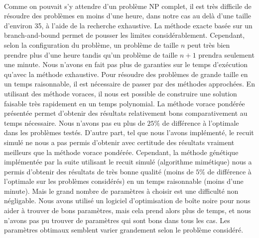 \documentclass[12pt,letterpaper,twoside]{article}
\begin{document}
		\paragraph*{}
			Comme on pouvait s'y attendre d'un problème NP complet,
			il est très difficile de résoudre des problèmes en moins d'une heure, dans notre cas au delà d'une
			taille d'environ 35, à l'aide de la recherche exhaustive.
			La méthode exacte basée sur un branch-and-bound permet de pousser les limites considérablement.
			Cependant, selon la configuration du problème, un problème de taille \(n\) peut très bien prendre plus d'une heure tandis
			qu'un problème de taille \(n+1\) prendra seulement une minute.
			Nous n'avons en fait pas plus de garanties sur le temps d'exécution qu'avec la méthode exhaustive.
			Pour résoudre des problèmes de grande taille en un temps raisonnable, il est nécessaire de passer par des méthodes
			approchées. En utilisant des méthode voraces, il nous est possible de construire une solution faisable
			très rapidement en un temps polynomial. La méthode vorace pondérée présentée permet d'obtenir des résultats
			relativement bons comparativement au temps nécessaire. Nous n'avons pas eu plus de \(25\%\) de différence à l'optimale
			dans les problèmes testés. D'autre part, tel que nous l'avons implémenté, le recuit simulé ne nous a pas permis
			d'obtenir avec certitude des résultats vraiment meilleurs que la méthode vorace pondérée.
			Cependant, la méthode génétique implémentée par la suite utilisant le recuit simulé (algorithme mimétique)
			nous a permis d'obtenir des résultats de très bonne qualité (moins de \(5\%\) de différence à l'optimale sur
			les problèmes considérés) en un temps raisonnable (moins d'une minute). Mais le grand nombre de paramètres à
			choisir est une difficulté non négligable. Nous avons utilisé un logiciel d'optimisation de boîte noire pour nous aider
			à trouver de bons paramètres, mais cela prend alors plus de temps, et nous n'avons pas pu trouver de paramètres qui sont
			bons dans tous les cas. Les paramètres obtimaux semblent varier grandement selon le problème considéré.
	\newpage\printbibliography[heading=bibintoc]{}
\end{document}
